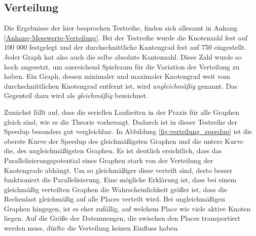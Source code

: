 \subsection{Verteilung} %
\label{sub:verteilung}
Die Ergebnisse der hier besprochen Testreihe, finden sich allesamt in Anhang \ref{Anhang-Messwerte-Verteilung}. Bei der Testreihe wurde die Knotenzahl fest auf 100 000 festgelegt und der durchschnittliche Kantengrad fest auf 750 eingestellt. Jeder Graph hat also auch die selbe absolute Kantenzahl. Diese Zahl wurde so hoch angesetzt, um ausreichend Spielraum für die Variation der Verteilung zu haben. Ein Graph, dessen minimaler und maximaler Knotengrad weit vom durchschnittlichen Knotengrad entfernt ist, wird \textit{ungleichmäßig} genannt. Das Gegenteil dazu wird als \textit{gleichmäßig} bezeichnet. 

Zunächst fällt auf, dass die seriellen Laufzeiten in der Praxis für alle Graphen gleich sind, wie es die Theorie vorhersagt. Dadurch ist in dieser Testreihe der Speedup besonders gut vergleichbar. In Abbildung \ref{fig:verteilung_speedup} ist die oberste Kurve der Speedup des gleichmäßigsten Graphen und die untere Kurve die, des ungleichmäßigsten Graphen. Es ist deutlich ersichtlich, dass das Parallelisierungspotential eines Graphen stark von der Verteilung der Knotengrade abhängt. Um so gleichmäßiger diese verteilt sind, desto besser funktioniert die Parallelisierung. Eine mögliche Erklärung ist, dass bei einem gleichmäßig verteilten Graphen die Wahrscheinlichkeit größer ist, dass die Rechenlast gleichmäßig auf alle Places verteilt wird. Bei ungleichmäßigen Graphen hingegen, ist es eher zufällig, auf welchem Place wie viele aktive Knoten liegen. Auf die Größe der Datenmengen, die zwischen den Places transportiert werden muss, dürfte die Verteilung keinen Einfluss haben.

